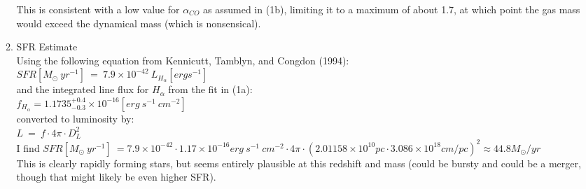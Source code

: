 \documentclass[11pt]{article}
\begin{document}
\begin{enumerate}
\begin{enumerate}
	 This is consistent with a low value for $\alpha_{CO}$ as assumed in (1b), limiting it to a maximum of about 1.7, at which point the gas mass would exceed the dynamical mass (which is nonsensical).\\
	 
	 
	 
	 
	 
	 \item SFR Estimate %
	 \\
	 Using the following equation from Kennicutt, Tamblyn, and Congdon (1994):\\
	 
	 \hspace{10mm} $SFR [M_{\odot}\ yr^{-1}]\ =\ 7.9 \times 10^{-42}\ L_{H_{\alpha}} [erg s^{-1}]$\\
	 
	 and the integrated line flux for $H_{\alpha}$ from the fit in (1a):\\
		 
	  $f_{H_{\alpha}} = 1.1735^{+0.4}_{-0.3} \times 10^{-16} [erg\ s^{-1}\ cm^{-2}]$\\
	 
	 converted to luminosity by:\\
	 
	  \hspace{10mm} $L\ =\ f \cdot 4\pi \cdot D^{2}_{L}$\\
	  
	  
	  I find $SFR [M_{\odot}\ yr^{-1}]\ = 7.9 \times 10^{-42} \cdot 1.17 \times 10^{-16} erg\ s^{-1}\ cm^{-2} \cdot 4\pi \cdot (2.01158 \times 10^{10} pc \cdot 3.086 \times 10 ^{18} cm/pc)^2 \approx 44.8 M_{\odot}/yr$ \\
	  
	  This is clearly rapidly forming stars, but seems entirely plausible at this redshift and mass (could be bursty and could be a merger, though that might likely be even higher SFR).
	 
	 
	 
	
 
   \end{enumerate}

\end{enumerate}
\end{document}
